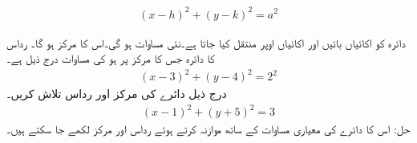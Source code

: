 \begin{align}
(x-h)^2+(y-k)^2=a^2
\end{align}

دائرہ  کو  اکائیاں بائیں اور  اکائیاں اوپر منتقل کیا جاتا ہے۔نئی مساوات  ہو گی۔اس کا مرکز  ہو گا۔
رداس  کا دائرہ جس کا مرکز   پر ہو کی مساوات درج ذیل ہے۔
\begin{align*}
(x-3)^2+(y-4)^2=2^2
\end{align*}
درج ذیل دائرے کی مرکز  اور رداس تلاش کریں۔
\begin{align*}
(x-1)^2+(y+5)^2=3
\end{align*}
حل:\quad
اس کا دائرے کی معیاری مساوات کے ساتھ موازنہ کرتے ہوئے رداس  اور مرکز  لکھے جا سکتے ہیں۔  

